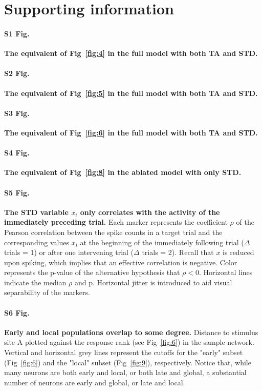 \documentclass[10pt,letterpaper]{article}
\newcommand{\FIG}[1]{Fig~\ref{fig:#1}}
\begin{document}
  \section*{Supporting information}
  
  \paragraph*{S1 Fig.}\label{S1_Fig}
  \textbf{The equivalent of \FIG{4} in the full model with both TA and STD.}
  
  \paragraph*{S2 Fig.}
  \label{S2_Fig}
  \textbf{The equivalent of \FIG{5} in the full model with both TA and STD.}
  
  \paragraph*{S3 Fig.}
  \label{S3_Fig}
  \textbf{The equivalent of \FIG{6} in the full model with both TA and STD.}
  
  \paragraph*{S4 Fig.}
  \label{S4_Fig}
  \textbf{The equivalent of \FIG{8} in the ablated model with only STD.}
  
  \paragraph*{S5 Fig.}
  \label{S5_Fig}
  \textbf{The STD variable $x_i$ only correlates with the activity of the immediately preceding trial.}
  Each marker represents the coefficient $\rho$ of the Pearson correlation between the spike counts in a target trial and the corresponding values $x_i$ at the beginning of the immediately following trial ($\Delta$ trials = 1) or after one intervening trial ($\Delta$ trials = 2). Recall that $x$ is reduced upon spiking, which implies that an effective correlation is negative. Color represents the p-value of the alternative hypothesis that $\rho < 0$. Horizontal lines indicate the median $\rho$ and p. Horizontal jitter is introduced to aid visual separability of the markers.
  
  \paragraph*{S6 Fig.}
  \label{S6_Fig}
  \textbf{Early and local populations overlap to some degree.}
  Distance to stimulus site A plotted against the response rank (see \FIG{6}) in the sample network. Vertical and horizontal grey lines represent the cutoffs for the "early" subset (\FIG{6}) and the "local" subset (\FIG{9}), respectively. Notice that, while many neurons are both early and local, or both late and global, a substantial number of neurons are early and global, or late and local.
  
\end{document}
